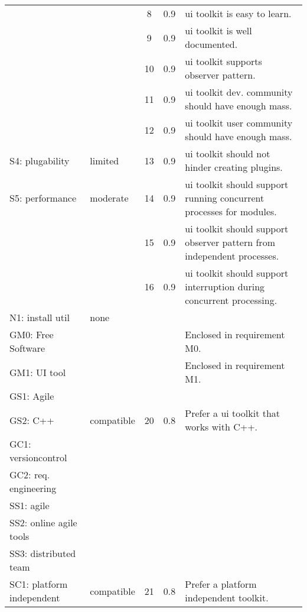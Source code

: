 \begin{center}
\begin{longtable}{ll||ccp{13em}}
	                         &              &  8  & 0.9 & ui toolkit is easy to learn.\\
	                         &              &  9  & 0.9 & ui toolkit is well documented.\\
	                         &              & 10  & 0.9 & ui toolkit supports observer pattern.\\
	                         &              & 11  & 0.9 & ui toolkit dev. community should have enough mass.\\
	                         &              & 12  & 0.9 & ui toolkit user community should have enough mass.\\
        S4: plugability      & limited      & 13  & 0.9 & ui toolkit should not hinder creating plugins.\\
        S5: performance	     & moderate     & 14  & 0.9 & ui toolkit should support running concurrent processes for modules.\\
	                         &              & 15  & 0.9 & ui toolkit should support observer pattern from independent processes.\\
	                         &              & 16  & 0.9 & ui toolkit should support interruption during concurrent processing.\\
        N1: install util          & none         &     &     & \\\hline
		GM0: Free Software  &              &     &     & Enclosed in requirement M0.\\  
        GM1: UI tool	    &              &     &     & Enclosed in requirement M1.\\
        GS1: Agile	        &              &     &     & \\
        GS2: C++	        & compatible   & 20  & 0.8 & Prefer a ui toolkit that works with C++.\\
        GC1: versioncontrol &              &     &     & \\
        GC2: req. engineering
						    &              &     &     & \\\hline
        SS1: agile	        &              &     &     & \\
        SS2: online agile tools
							&              &     &     & \\
        SS3: distributed team     
							&              &     &     & \\
        SC1: platform independent 
							& compatible	 & 21  & 0.8 & Prefer a platform independent toolkit.\\
    \end{longtable}
    \label{tab: uitool-requirements}
\end{center}


